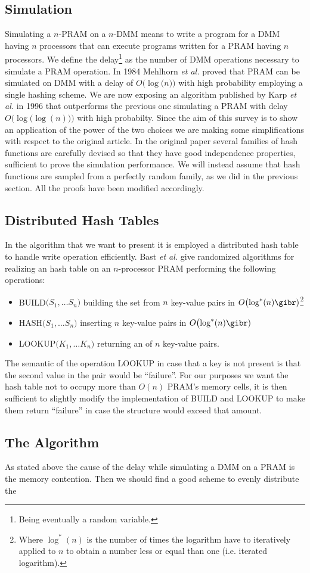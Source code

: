 \subsection{Simulation}
Simulating a $n$-PRAM on a $n$-DMM means to write a program for a DMM having
$n$ processors that can execute programs written for a PRAM having
$n$ processors. We define the delay\footnote{Being eventually
  a random variable.} as the number of DMM operations necessary to simulate
a PRAM operation. In 1984 Mehlhorn {\em et al.} \cite{art} proved that PRAM
can be simulated on DMM with a delay of $O\bigl(\log\bigl(n\bigr)\bigr)$
 with high probability employing a single hashing scheme. 
We are now exposing an algorithm published by Karp {\em et al.} \cite{Karp} in
1996 that
outperforms the previous one simulating a PRAM with delay
$O\bigl(\log\bigl(\log(n)\bigr)\bigr)$ with high probabilty.
Since the aim of this survey is to show an application of the power of the two
choices we are making some simplifications with respect to the original article.
In the original paper several families of hash
functions are carefully
devised so that they have good independence properties,
sufficient to prove the simulation 
performance. We will instead assume that hash functions are sampled from
a perfectly random family, as we did in the previous section. All the proofs
have been modified accordingly.

\subsection{Distributed Hash Tables}
In the algorithm that we want to present it is employed a distributed hash
table to handle write operation efficiently. Bast {\em et al.} \cite{Bast}
give randomized algorithms for realizing an hash table on an $n$-processor PRAM
performing the following operations:
\begin{itemize}
\item BUILD$\bigl(S_1, \dots S_n\bigr)$ building the set from $n$ key-value
  pairs in $O\bigl(\log^*(n)\gibr)$\footnote{Where $\log^*(n)$ is the number of
    times the logarithm have to iteratively applied to $n$ to obtain a number
    less or equal than one (i.e. iterated logarithm).}
\item HASH$\bigl(S_1, \dots S_n\bigr)$ inserting $n$ key-value pairs in  
  $O\bigl(\log^*(n)\gibr)$
\item LOOKUP$\bigl(K_1, \dots K_n\bigr)$ returning an of $n$ key-value pairs.
\end{itemize}
The semantic of the operation LOOKUP in case that a key is not present is that
the second value in the pair would be ``failure''. For our purposes we want
the hash table not to occupy more than $O(n)$ PRAM's memory cells, it is
then sufficient to slightly modify the implementation of BUILD and LOOKUP
to make them return ``failure'' in case the structure would exceed that amount.



\subsection{The Algorithm}
As stated above the cause of the delay while simulating a DMM on a PRAM is
the memory contention. Then we should find a good scheme to evenly distribute
the 





